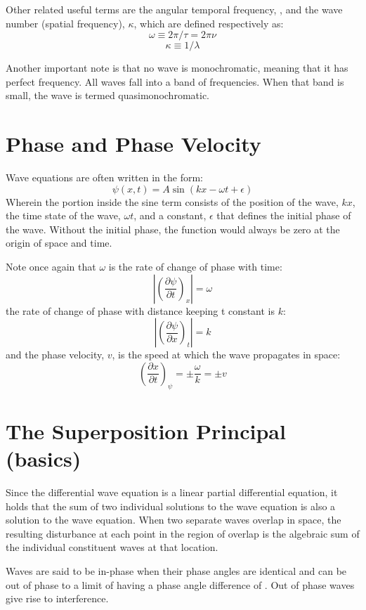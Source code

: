 \documentclass[12pt]{report}
\begin{document}
Other related useful terms are the angular temporal frequency, \textomega , and the wave number (spatial frequency), $\kappa$, which are defined respectively as:
\begin{equation}
\omega \equiv 2\pi/\tau = 2\pi\nu
\end{equation}
\begin{equation}
\kappa \equiv 1/\lambda
\end{equation}

Another important note is that no wave is monochromatic, meaning that it has perfect frequency. All waves fall into a band of frequencies. When that band is small, the wave is termed quasimonochromatic. 

\section{Phase and Phase Velocity}
Wave equations are often written in the form: 
\begin{equation}
\psi(x,t) = A \sin (kx-\omega t +\epsilon)
\end{equation}
Wherein the portion inside the sine term consists of the position of the wave, $kx$, the time state of the wave, $\omega t$, and a constant, $\epsilon$ that defines the initial phase of the wave. Without the initial phase, the function would always be zero at the origin of space and time.

Note once again that $\omega$ is the rate of change of phase with time:
\[|(\frac{\partial\psi}{\partial t})_x|=\omega\]
the rate of change of phase with distance keeping t constant is $k$:
\[|(\frac{\partial\psi}{\partial x})_t|=k\]
and the phase velocity, $v$, is the speed at which the wave propagates in space:
\[(\frac{\partial x}{\partial t})_\psi = \pm \frac{\omega}{k} = \pm v  \]

\section{The Superposition Principal (basics)}
Since the differential wave equation is a linear partial differential equation, it holds that the sum of two individual solutions to the wave equation is also a solution to the wave equation. When two separate waves overlap in space, the resulting disturbance at each point in the region of overlap is the algebraic sum of the individual constituent waves at that location. 

Waves are said to be in-phase when their phase angles are identical and can be out of phase to a limit of having a phase angle difference of \textpi. Out of phase waves give rise to interference. 
\end{document}
